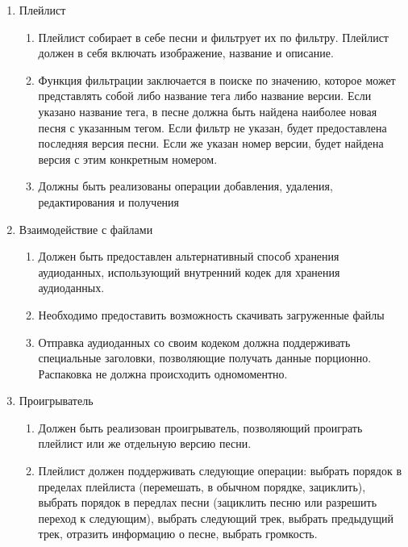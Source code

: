\documentclass[14pt]{extarticle}
\begin{document}
\begin{enumerate}
\begin{enumerate}
	\end{enumerate}
	\item Плейлист
	\begin{enumerate}
		\item Плейлист собирает в себе песни и фильтрует их по фильтру. Плейлист должен в себя включать изображение, название и описание.
		\item Функция фильтрации заключается в поиске по значению, которое может представлять собой либо название тега либо название версии. Если указано название тега, в песне должна быть найдена наиболее новая песня с указанным тегом. Если фильтр не указан, будет предоставлена последняя версия песни. Если же указан номер версии, будет найдена версия с этим конкретным номером.
		\item Должны быть реализованы операции добавления, удаления, редактирования и получения
	\end{enumerate}
	\item Взаимодействие с файлами
	\begin{enumerate}
		\item Должен быть предоставлен альтернативный способ хранения аудиоданных, использующий внутренний кодек для хранения аудиоданных.
		\item Необходимо предоставить возможность скачивать загруженные файлы
		\item Отправка аудиоданных со своим кодеком должна поддерживать специальные заголовки, позволяющие получать данные порционно. Распаковка не должна происходить одномоментно.
	\end{enumerate}
	\item Проигрыватель
	\begin{enumerate}
		\item Должен быть реализован проигрыватель, позволяющий проиграть плейлист или же отдельную версию песни.
		\item Плейлист должен поддерживать следующие операции: выбрать порядок в пределах плейлиста (перемешать, в обычном порядке, зациклить), выбрать порядок в передлах песни (зациклить песню или разрешить переход к следующим), выбрать следующий трек, выбрать предыдущий трек, отразить информацию о песне, выбрать громкость.
	\end{enumerate}
\end{enumerate}
\end{document}
